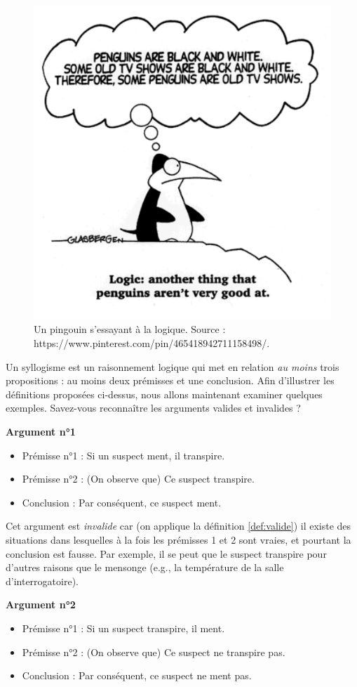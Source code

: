 \documentclass[
  a4paper,11pt,twoside,onecolumn,openright,final,oldfontcommands]{memoir}
\providecommand{\tightlist}{%
  \setlength{\itemsep}{0pt}\setlength{\parskip}{0pt}}
\theoremstyle{definition}
\theoremstyle{definition}
\theoremstyle{definition}
\theoremstyle{definition}
\theoremstyle{remark}
\begin{document}
\begin{figure}[!htb]

{\centering \includegraphics[width=0.5\linewidth]{figures/penguin} 

}

\caption{Un pingouin s'essayant à la logique. Source : https://www.pinterest.com/pin/465418942711158498/.}\label{fig:penguin}
\end{figure}

Un syllogisme est un raisonnement logique qui met en relation \emph{au moins} trois propositions : au moins deux prémisses et une conclusion. Afin d'illustrer les définitions proposées ci-dessus, nous allons maintenant examiner quelques exemples. Savez-vous reconnaître les arguments valides et invalides ?

\textbf{Argument n°1}

\begin{itemize}
\tightlist
\item
  Prémisse n°1 : Si un suspect ment, il transpire.
\item
  Prémisse n°2 : (On observe que) Ce suspect transpire.
\item
  Conclusion : Par conséquent, ce suspect ment.
\end{itemize}

Cet argument est \emph{invalide} car (on applique la définition \ref{def:valide}) il existe des situations dans lesquelles à la fois les prémisses 1 et 2 sont vraies, et pourtant la conclusion est fausse. Par exemple, il se peut que le suspect transpire pour d'autres raisons que le mensonge (e.g., la température de la salle d'interrogatoire).

\textbf{Argument n°2}

\begin{itemize}
\tightlist
\item
  Prémisse n°1 : Si un suspect transpire, il ment.
\item
  Prémisse n°2 : (On observe que) Ce suspect ne transpire pas.
\item
  Conclusion : Par conséquent, ce suspect ne ment pas.
\end{itemize}
\end{document}
